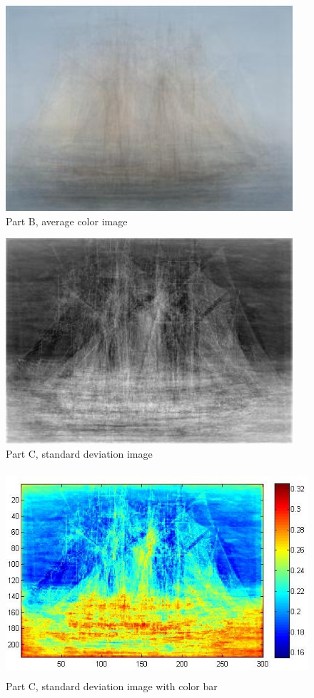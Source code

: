 \documentclass[11pt,psfig]{article}
\begin{document}
\begin{figure}[H]
\centering
\includegraphics[height=3in]{set1color.jpg}
\caption{Part B, average color image}
\end{figure}

\begin{figure}[H]
\centering
\includegraphics[height=3in]{set1grayscaleStndDev.jpg}
\caption{Part C, standard deviation image}
\end{figure}

\begin{figure}[H]
\centering
\includegraphics[height=3in]{set1grayscaleStndDev_colorbar.jpg}
\caption{Part C, standard deviation image with color bar}
\end{figure}
\end{document}
